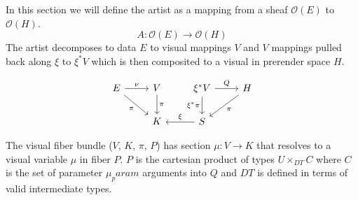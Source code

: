 \documentclass[../main.tex]{subfiles}
\begin{document}
In this section we will define the artist as a mapping from a sheaf $\mathcal{O}(E)$  to $\mathcal{O}(H)$. 
\begin{equation}
    A: \mathcal{O}(E) \rightarrow \mathcal{O}(H)
\end{equation}
The artist decomposes to data $E$ to visual mappings $V$ and $V$ mappings pulled back along $\xi$ to $\xi^*V$ which is then composited to a visual in prerender space $H$. 

\begin{equation}
    \label{eq:artist}
\begin{tikzcd}
    E \arrow[r, "\nu"] \arrow[rd, "\pi"'] & V \arrow[d, "\pi"] & \xi^*V \arrow[r, "Q"] \arrow[d, "\xi^*\pi"'] & H \arrow[ld, "\pi"] \\
                                          & K                  & S \arrow[l, "\xi"']                          &                    
\end{tikzcd}
\end{equation}

The visual fiber bundle ($V$, $K$, $\pi$, $P$) has section $\mu: V \rightarrow K$ that resolves to a visual variable $\mu$ \cite{bertinIIPropertiesGraphic2011,munznerMarksChannels} in fiber $P$.  $P$ is the cartesian product of types $U \times_{DT} C$ where $C$ is the set of parameter $\mu_param$ arguments into $Q$ and $DT$ is defined in terms of valid intermediate types. 
\end{document}

